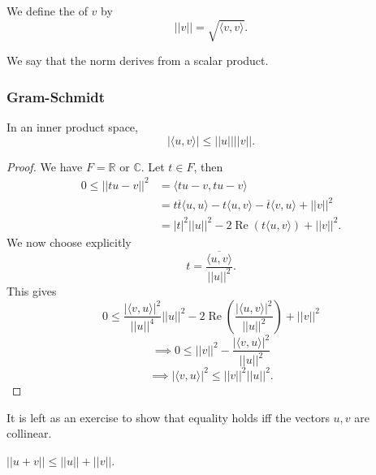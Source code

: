 \documentclass[a4paper]{scrartcl}
\begin{document}
\begin{definition}
      We define the  of $v$ by 
      \[||v||=\sqrt{\langle v,v \rangle }.\]
\end{definition}
\begin{remark}
      We say that the norm derives from a scalar product.
\end{remark}
\subsubsection{Gram-Schmidt}
\begin{theorem}
      In an inner product space, 
      \[|\langle u,v \rangle |\leq ||u||||v||.\]
      
\end{theorem}
\begin{proof}
      We have $F=\mathbb{R}$ or $\mathbb{C}$. Let $t \in F$, then 
      \begin{equation*}
            \begin{split}
               0 \leq ||tu-v||^2 &=\langle tu-v,tu-v \rangle \\
               &=t \overline{t} \langle u,u \rangle -t\langle u,v \rangle -\overline{t} \langle v,u \rangle +||v||^2\\
               &=|t|^2 ||u||^2-2 \operatorname{Re}(t\langle u,v \rangle )+||v||^2.
            \end{split}
      \end{equation*}
      We now choose explicitly 
      \[t=\frac{\overline{\langle u,v \rangle } }{||u||^2}.\]
      This gives 
      \[0 \leq \frac{|\langle v,u \rangle |^2}{||u||^4}||u||^2-2 \operatorname{Re}\left(\frac{|\langle u,v \rangle |^2}{||u||^2}\right)+||v||^2\]
      \[\implies 0 \leq ||v||^2-\frac{|\langle v,u \rangle |^2}{||u||^2}\]
      \[\implies |\langle v,u \rangle |^2 \leq ||v||^2 ||u||^2.\]
\end{proof}
\begin{remark}
      It is left as an exercise to show that equality holds iff the vectors $u,v$ are collinear.
\end{remark}
\begin{corollary}
     $||u+v||\leq ||u||+||v||$.
\end{corollary}
\end{document}
